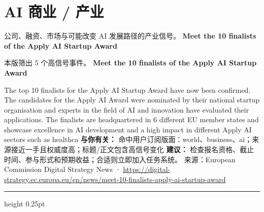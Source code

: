 \documentclass[10.5pt]{ctexart}
\begin{document}
\section*{AI 商业 / 产业}
{\color{ormuted} 公司、融资、市场与可能改变 AI 发展路径的产业信号。}
\vspace{2mm}
{\LARGE\bfseries Meet the 10 finalists of the Apply AI Startup Award}\par
\vspace{1mm}
{\color{ormuted} 本版筛出 5 个高信号事件。}
\vspace{3mm}
{\Large\bfseries Meet the 10 finalists of the Apply AI Startup Award}\par
The top 10 finalists for the Apply AI Startup Award have now been confirmed. The candidates for the Apply AI Award were nominated by their national startup organisation and experts in the field of AI and innovation have evaluated their applications. The finalists are headquartered in 6 different EU member states and showcase excellence in AI development and a high impact in different Apply AI sectors such as healthca
\textbf{与你有关：} 命中用户订阅版面：world、business、ai；来源接近一手且权威度高；标题/正文包含高信号变化
\textbf{建议：} 检查报名资格、截止时间、参与形式和预期收益；合适则立即加入任务系统。
{\footnotesize\color{ormuted} 来源：European Commission Digital Strategy News · \url{https://digital-strategy.ec.europa.eu/en/news/meet-10-finalists-apply-ai-startup-award}}
\vspace{4mm}
\hrule height 0.25pt
\vspace{3mm}
\end{document}
